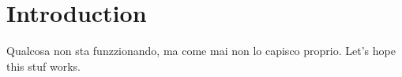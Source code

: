 \documentclass{article}
\begin{document}
    \section{Introduction}
    Qualcosa non sta funzzionando, ma come mai non lo capisco proprio. Let's hope this stuf works.
\end{document}
